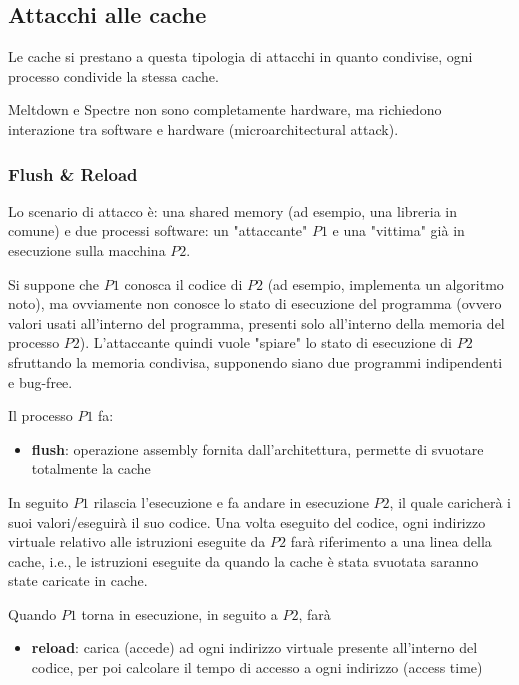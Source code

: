 \subsection{Attacchi alle cache}

Le cache si prestano a questa tipologia di attacchi in quanto condivise, ogni processo condivide la stessa cache. 

Meltdown e Spectre non sono completamente hardware, ma richiedono interazione tra software e hardware (microarchitectural attack).

\subsubsection{Flush \& Reload}

Lo scenario di attacco è: una shared memory (ad esempio, una libreria in comune) e due processi software: un "attaccante" $P1$ e una "vittima" già in esecuzione sulla macchina $P2$. 

Si suppone che $P1$ conosca il codice di $P2$ (ad esempio, implementa un algoritmo noto), ma ovviamente non conosce lo stato di esecuzione del programma (ovvero valori usati all'interno del programma, presenti solo all'interno della memoria del processo $P2$). L'attaccante quindi vuole "spiare" lo stato di esecuzione di $P2$ sfruttando la memoria condivisa, supponendo siano due programmi indipendenti e bug-free.

Il processo $P1$ fa: 
\begin{itemize}
	\item \textbf{flush}: operazione assembly fornita dall'architettura, permette di svuotare totalmente la cache
\end{itemize}

In seguito $P1$ rilascia l'esecuzione e fa andare in esecuzione $P2$, il quale caricherà i suoi valori/eseguirà il suo codice. Una volta eseguito del codice, ogni indirizzo virtuale relativo alle istruzioni eseguite da $P2$ farà riferimento a una linea della cache, i.e., le istruzioni eseguite da quando la cache è stata svuotata saranno state caricate in cache.

Quando $P1$ torna in esecuzione, in seguito a $P2$, farà
\begin{itemize}
	\item \textbf{reload}: carica (accede) ad ogni indirizzo virtuale presente all'interno del codice, per poi calcolare il tempo di accesso a ogni indirizzo (access time)
\end{itemize}

